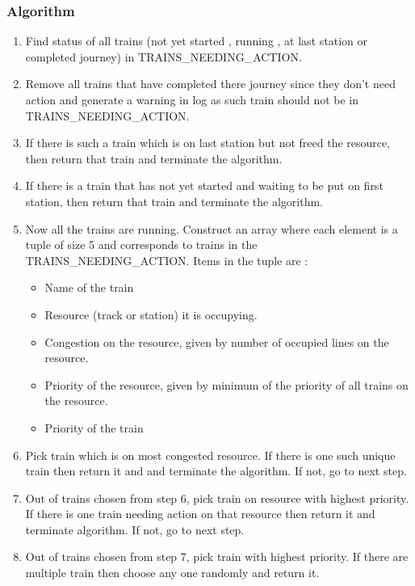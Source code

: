 \subsubsection{Algorithm}
\begin{enumerate}

\item Find status of all trains (not yet started , running , at last station or completed journey) in  
    TRAINS\_NEEDING\_ACTION.
\item Remove all trains that have completed there journey since they don't need action and generate a warning in log 
    as such train should not be in TRAINS\_NEEDING\_ACTION.
\item If there is such a train which is on last station but not freed the resource, then return that train 
     and terminate the algorithm.
\item If there is a train that has not yet started and waiting to be put on first station, then 
     return that train and terminate the algorithm.
\item Now all the trains are running. Construct an array where each element is a tuple of size 5 and corresponds to trains in 
    the TRAINS\_NEEDING\_ACTION. Items in the tuple are : 
\begin{itemize}
\item Name of the train
\item Resource (track or station) it is occupying.
\item Congestion on the resource, given by number of occupied lines on the resource.
\item Priority of the resource, given by minimum of the priority of all trains on the resource. 
\item Priority of the train
\end{itemize}

\item Pick train which is on most congested resource. If there is one such unique train then return it and 
     and terminate the algorithm. If not, go to next step.
\item Out of trains chosen from step 6, pick train on resource with highest priority. If there is one train needing action on that resource 
     then return it and terminate algorithm. If not, go to next step.
\item Out of trains chosen from step 7, pick train with highest priority. If there are multiple train then choose any one randomly and return it. 
\end{enumerate}

